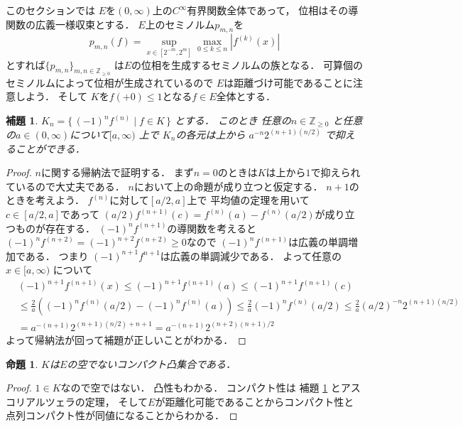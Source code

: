 \documentclass[leqno, a4paper, 12pt]{jsarticle}
\newtheorem{prop}[thm]{命題}
\newtheorem{lem}[thm]{補題}
\newcommand{\zz}{\mathbb{Z}}
\begin{document}
このセクションでは
$E$を$(0, \infty)$上の$C^{\infty}$有界関数全体であって，
位相はその導関数の広義一様収束とする．
$E$上のセミノルム$p_{m, n}$を
\[
p_{m, n}(f)=\sup_{x\in [2^{-m}, 2^{m}]}\max_{0\le k\le n}
\left|f^{(k)}(x)\right|
\]
とすれば$\{p_{m, n}\}_{m, n\in \zz_{\ge 0}}$
は$E$の位相を生成するセミノルムの族となる．
可算個のセミノルムによって位相が生成されているので
$E$は距離づけ可能であることに注意しよう．
そして
$K$を$f(+0)\le 1$となる$f\in E$全体とする．
\begin{lem}\label{lem:ueue}
$K_{n}=\{\, (-1)^{n}f^{(n)}\mid f\in K\, \}$
とする．
このとき
任意の$n\in \zz_{\ge 0}$
と任意の$a\in (0, \infty)$について$[a, \infty)$
上で
$K_{n}$の各元は上から
$a^{-n}2^{(n+1)(n/2)}$
で抑えることができる．
\end{lem}
\begin{proof}
$n$に関する帰納法で証明する．
まず$n=0$のときは$K$は上から$1$で抑えられているので大丈夫である．
$n$において上の命題が成り立つと仮定する．
$n+1$のときを考えよう．
$f^{(n)}$に対して$[a/2, a]$上で
平均値の定理を用いて
$c\in [a/2, a]$であって
$(a/2)f^{(n+1)}(c)=f^{(n)}(a)-f^{(n)}(a/2)$が成り立つものが存在する．
$(-1)^{n}f^{(n+1)}$の導関数を考えると
$(-1)^{n}f^{(n+2)}=(-1)^{n+2}f^{(n+2)}\ge 0$なので
$(-1)^{n}f^{(n+1)}$は広義の単調増加である．
つまり
$(-1)^{n+1}f^{n+1}$は広義の単調減少である．
よって任意の$x\in [a, \infty)$
について
\begin{align*}
&(-1)^{n+1}f^{(n+1)}(x)\le 
(-1)^{n+1}f^{(n+1)}(a)\le 
(-1)^{n+1}f^{(n+1)}(c)\\
&
\le \frac{2}{a}((-1)^{n}f^{(n)}(a/2)-(-1)^{n}f^{(n)}(a))
\le \frac{2}{a}(-1)^{n}f^{(n)}(a/2)
\le \frac{2}{a}(a/2)^{-n}2^{(n+1)(n/2)}\\
&=a^{-(n+1)}2^{(n+1)(n/2)+n+1}
=a^{-(n+1)}2^{(n+2)(n+1)/2}
\end{align*}
よって帰納法が回って補題が正しいことがわかる．
\end{proof}

\begin{prop}
$K$は$E$の空でないコンパクト凸集合である．
\end{prop}
\begin{proof}
$1\in K$なので空ではない．
凸性もわかる．
コンパクト性は
補題 
\ref{lem:ueue}
とアスコリアルツェラの定理，
そして$E$が距離化可能であることからコンパクト性と点列コンパクト性が同値になることからわかる．
\end{proof}
\end{document}
